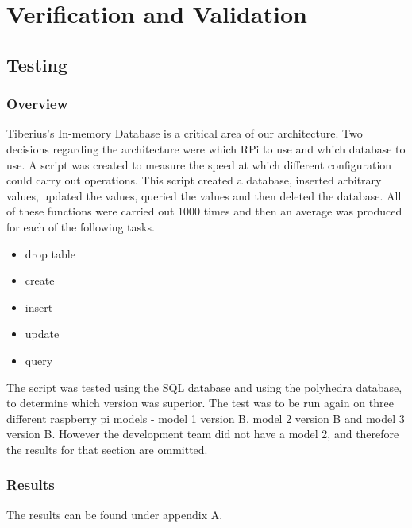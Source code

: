 \section{Verification and Validation}

\subsection{Testing}
\subsubsection{Overview}
Tiberius's In-memory Database is a critical area of our architecture. Two decisions regarding the architecture were which RPi to use and which database to use. A script was created to measure the speed at which different configuration could carry out operations. This script created a database, inserted arbitrary values, updated the values, queried the  values and then deleted the database. All of these functions were carried out 1000 times and then an average was produced for each of the following tasks.
\begin{itemize}
\item drop table
\item create
\item insert
\item update
\item query
\end{itemize}

The script was tested using the SQL database and using the polyhedra database, to determine which version was superior. The test was to be run again on three different raspberry pi models - model 1 version B, model 2 version B and model 3 version B. However the development team did not have a model 2, and therefore the results for that section are ommitted. 

\subsubsection{Results}
The results can be found under appendix A.

